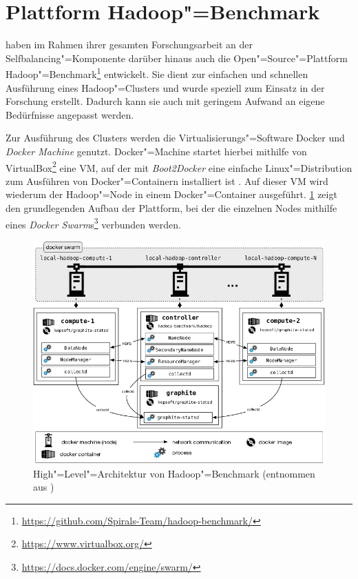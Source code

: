 \section{Plattform Hadoop"=Benchmark}
\label{sec:hadoopBenchmark}

\citeauthor{Zhang2016} haben im Rahmen ihrer gesamten Forschungsarbeit an der Selfbalancing"=Komponente darüber hinaus auch die Open"=Source"=Plattform Hadoop"=Benchmark\footnote{\url{https://github.com/Spirals-Team/hadoop-benchmark/}} entwickelt.
Sie dient zur einfachen und schnellen Ausführung eines Hadoop"=Clusters und wurde speziell zum Einsatz in der Forschung erstellt.
Dadurch kann sie auch mit geringem Aufwand an eigene Bedürfnisse angepasst werden.

Zur Ausführung des Clusters werden die Virtualisierungs"=Software Docker und \emph{Docker Machine} genutzt.
Docker"=Machine startet hierbei mithilfe von VirtualBox\footnote{\url{https://www.virtualbox.org/}} eine VM, auf der mit \emph{Boot2Docker} eine einfache Linux"=Distribution zum Ausführen von Docker"=Containern installiert ist \cite{DockerMachineGettingStartedVm}.
Auf dieser VM wird wiederum der Hadoop"=Node in einem Docker"=Container ausgeführt.
\cref{fig:hadoopBenchmarkArchitecture} zeigt den grundlegenden Aufbau der Plattform, bei der die einzelnen Nodes mithilfe eines \emph{Docker  Swarm}s\footnote{\url{https://docs.docker.com/engine/swarm/}} verbunden werden.

\begin{figure}
    \includegraphics{./resources/hadoopBenchmarkArch.png}
    \caption[High"=Level"=Architektur von Hadoop"=Benchmark]
    {High"=Level"=Architektur von Hadoop"=Benchmark (entnommen aus \cite{abb:hadoopBenchmarkArch})}
    \label{fig:hadoopBenchmarkArchitecture}
\end{figure}

